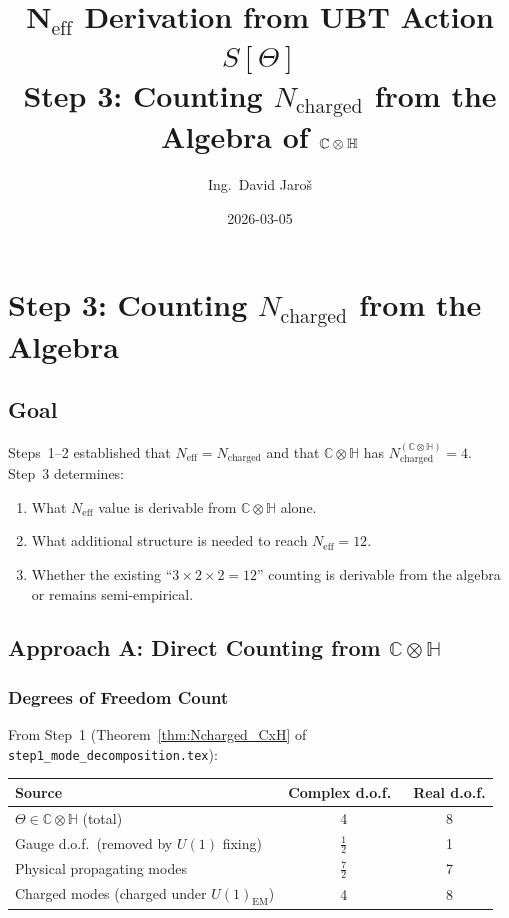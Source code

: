 \documentclass[11pt,a4paper]{article}
\title{N$_{\mathrm{eff}}$ Derivation from UBT Action $S[\Theta]$\\
    \large Step 3: Counting $N_{\mathrm{charged}}$ from the Algebra of $\C\otimes\H$}
\author{Ing.\ David Jaroš}
\date{2026-03-05}
\newcommand{\C}{\mathbb{C}}
\renewcommand{\H}{\mathbb{H}}
\theoremstyle{remark}
\begin{document}
  \maketitle
\fi

\section{Step 3: Counting $N_{\mathrm{charged}}$ from the Algebra}
\label{sec:step3_counting}

\subsection{Goal}

Steps~1--2 established that $N_{\mathrm{eff}} = N_{\mathrm{charged}}$ and that
$\C \otimes \H$ has $N_{\mathrm{charged}}^{(\C\otimes\H)} = 4$.
Step~3 determines:
\begin{enumerate}
  \item[(A)] What $N_{\mathrm{eff}}$ value is derivable from $\C\otimes\H$ alone.
  \item[(B)] What additional structure is needed to reach $N_{\mathrm{eff}} = 12$.
  \item[(C)] Whether the existing ``$3 \times 2 \times 2 = 12$'' counting is derivable
    from the algebra or remains semi-empirical.
\end{enumerate}

\subsection{Approach A: Direct Counting from $\C \otimes \H$}

\subsubsection{Degrees of Freedom Count}

From Step~1 (Theorem~\ref{thm:Ncharged_CxH} of \texttt{step1\_mode\_decomposition.tex}):

\begin{center}
\begin{tabular}{lcc}
  \toprule
  Source & Complex d.o.f.\ & Real d.o.f. \\
  \midrule
  $\Theta \in \C\otimes\H$ (total) & 4 & 8 \\
  Gauge d.o.f.\ (removed by $U(1)$ fixing) & $\frac{1}{2}$ & 1 \\
  Physical propagating modes & $\frac{7}{2}$ & 7 \\
  \midrule
  Charged modes (charged under $U(1)_{\mathrm{EM}}$) & 4 & 8 \\
  \bottomrule
\end{tabular}
\end{center}
\end{document}

